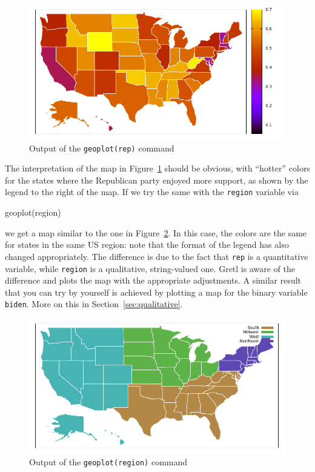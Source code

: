 \documentclass{article}
\begin{document}
\begin{figure}[htbp]
  \centering
  \includegraphics[scale=0.75]{us2020-rep}
  \caption{Output of the \texttt{geoplot(rep)} command}
  \label{fig:us2020-rep}
\end{figure}

The interpretation of the map in Figure~\ref{fig:us2020-rep} should be
obvious, with ``hotter'' colors for the states where the Republican
party enjoyed more support, as shown by the legend to the right of the
map. If we try the same with the \texttt{region} variable via
\begin{code}
  geoplot(region)
\end{code}
we get a map similar to the one in Figure~\ref{fig:us2020-reg}. In
this case, the colors are the same for states in the same US region:
note that the format of the legend has also changed appropriately. The
difference is due to the fact that \texttt{rep} is a quantitative
variable, while \texttt{region} is a qualitative, string-valued
one. Gretl is aware of the difference and plots the map with the
appropriate adjustments. A similar result that you can try by yourself
is achieved by plotting a map for the binary variable
\texttt{biden}. More on this in Section~\ref{sec:qualitative}.

\begin{figure}[htbp]
  \centering
  \includegraphics[scale=0.75]{us2020-reg}
  \caption{Output of the \texttt{geoplot(region)} command}
  \label{fig:us2020-reg}
\end{figure}
\end{document}
